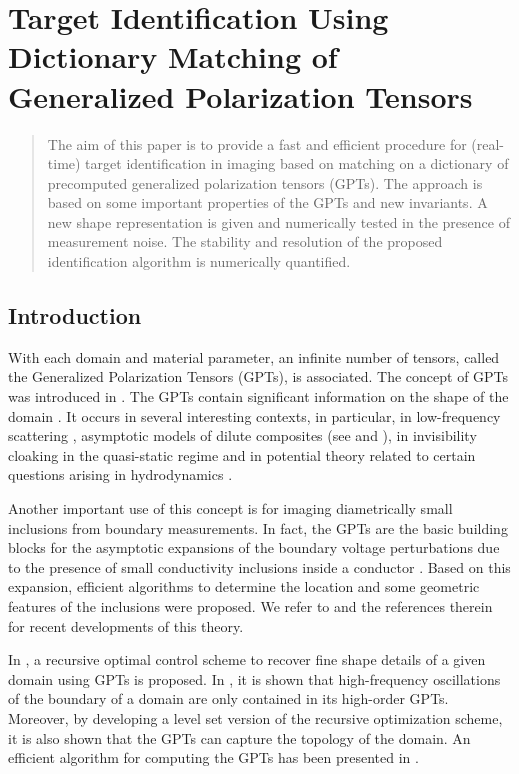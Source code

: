 \chapter{Target Identification Using Dictionary Matching
of Generalized Polarization Tensors}

\begin{abstract}
The aim of this paper is to provide a fast and efficient procedure
for (real-time) target identification in imaging based on matching
on a dictionary of precomputed generalized polarization tensors
(GPTs). The approach is based on some important properties of the
GPTs and new invariants. A new shape representation is given and
numerically tested in the presence of measurement noise. The
stability and resolution of the proposed identification algorithm
is numerically quantified.
\end{abstract}


\section{Introduction}\label{sec:introduction}

With each domain and material parameter, an infinite number of
tensors, called the Generalized Polarization Tensors (GPTs), is
associated. The concept of GPTs was introduced in
\cite{ammarisima02, ammari2004reconstruction}. The GPTs contain significant information
on the shape of the domain \cite{AK_MMS_03}. It occurs in several
interesting contexts, in particular, in low-frequency scattering
\cite{dassios, ammari2004reconstruction}, asymptotic models of dilute composites (see
\cite{milton2002theory} and \cite{AKT_AA_05}), in invisibility cloaking in
the quasi-static regime \cite{AKLL11} and in potential theory
related to certain questions arising in hydrodynamics \cite{PS51}.

Another important use of this concept is for imaging diametrically
small inclusions from boundary measurements. In fact, the GPTs are
the basic building blocks for the asymptotic expansions of the
boundary voltage perturbations due to the presence of small
conductivity inclusions inside a conductor \cite{FV_ARMA_89,cedio1998identification,
ammarisima02}. Based on this expansion, efficient algorithms to
determine the location and some geometric features of the
inclusions were proposed. We refer to \cite{ammari2004reconstruction,
ammari2007polarization} and the references therein for recent
developments of this theory.

In \cite{ammari2010conductivity}, a recursive optimal control scheme to recover
fine shape details of a given domain using GPTs is proposed. In
\cite{AGKLY11}, it is shown that high-frequency oscillations of
the boundary of a domain are only contained in its high-order
GPTs. Moreover, by developing a level set version of the recursive
optimization scheme, it is also shown that the GPTs can capture
the topology of the domain. An efficient algorithm for computing
the GPTs has been presented in \cite{yves}.


